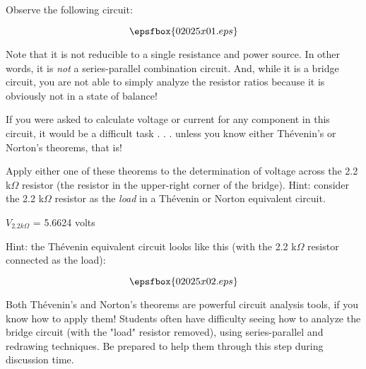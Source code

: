 

Observe the following circuit:

$$\epsfbox{02025x01.eps}$$

Note that it is not reducible to a single resistance and power source.  In other words, it is {\it not} a series-parallel combination circuit.  And, while it is a bridge circuit, you are not able to simply analyze the resistor ratios because it is obviously not in a state of balance!

If you were asked to calculate voltage or current for any component in this circuit, it would be a difficult task . . . unless you know either Th\'evenin's or Norton's theorems, that is!  

\vskip 10pt

Apply either one of these theorems to the determination of voltage across the 2.2 k$\Omega$ resistor (the resistor in the upper-right corner of the bridge).  Hint: consider the 2.2 k$\Omega$ resistor as the {\it load} in a Th\'evenin or Norton equivalent circuit.







$V_{2.2k\Omega}$ = 5.6624 volts

\vskip 10pt

Hint: the Th\'evenin equivalent circuit looks like this (with the 2.2 k$\Omega$ resistor connected as the load):

$$\epsfbox{02025x02.eps}$$







Both Th\'evenin's and Norton's theorems are powerful circuit analysis tools, if you know how to apply them!  Students often have difficulty seeing how to analyze the bridge circuit (with the "load" resistor removed), using series-parallel and redrawing techniques.  Be prepared to help them through this step during discussion time.




